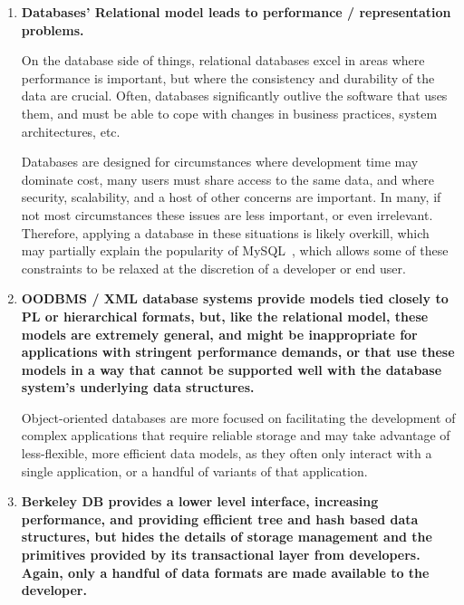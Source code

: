 \documentclass[letterpaper,twocolumn,english]{article}
\begin{document}
\begin{enumerate}

  \item{\bf Databases' Relational model leads to performance /
  representation problems.}

On the database side of things, relational databases excel in areas
where performance is important, but where the consistency and
durability of the data are crucial.  Often, databases significantly
outlive the software that uses them, and must be able to cope with
changes in business practices, system architectures,
etc.~\cite{relational}

Databases are designed for circumstances where development time may
dominate cost, many users must share access to the same data, and
where security, scalability, and a host of other concerns are
important.  In many, if not most circumstances these issues are less
important, or even irrelevant.  Therefore, applying a database in
these situations is likely overkill, which may partially explain the
popularity of MySQL~\cite{mysql}, which allows some of these
constraints to be relaxed at the discretion of a developer or end
user.

  \item{\bf OODBMS / XML database systems provide models tied closely to PL
  or hierarchical formats, but, like the relational model, these
  models are extremely general, and might be inappropriate for
  applications with stringent performance demands, or that use these
  models in a way that cannot be supported well with the database
  system's underlying data structures.}

Object-oriented databases are more focused on facilitating the
development of complex applications that require reliable storage and
may take advantage of less-flexible, more efficient data models, as
they often only interact with a single application, or a handful of
variants of that application.~\cite{lamb}

  \item{\bf Berkeley DB provides a lower level interface, increasing
  performance, and providing efficient tree and hash based data
  structures, but hides the details of storage management and the
  primitives provided by its transactional layer from
  developers. Again, only a handful of data formats are made available
  to the developer.}



\end{enumerate}
\end{document}
